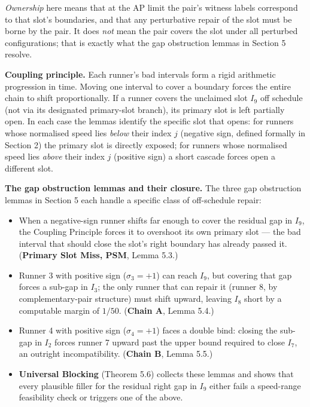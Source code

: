 \documentclass[12pt]{article}
\begin{document}
\emph{Ownership} here means that at the AP limit the pair's witness labels correspond to
that slot's boundaries, and that any perturbative repair of the slot must be borne by the
pair. It does \emph{not} mean the pair covers the slot under all perturbed configurations;
that is exactly what the gap obstruction lemmas in Section 5 resolve.

\textbf{Coupling principle.}
Each runner's bad intervals form a rigid arithmetic progression in time. Moving one
interval to cover a boundary forces the entire chain to shift proportionally. If a runner
covers the unclaimed slot $I_9$ off schedule (not via its designated primary-slot branch),
its primary slot is left partially open. In each case the lemmas identify the specific slot
that opens: for runners whose normalised speed lies \emph{below} their index $j$ (negative sign,
defined formally in Section 2) the primary slot is directly exposed; for runners whose
normalised speed lies \emph{above} their index $j$ (positive sign) a short cascade forces open
a different slot.

\textbf{The gap obstruction lemmas and their closure.}
The three gap obstruction lemmas in Section 5 each handle a specific class of off-schedule
repair:

\begin{itemize}
\item When a negative-sign runner shifts far enough to cover the residual gap in $I_9$, the
  Coupling Principle forces it to overshoot its own primary slot — the bad interval that
  should close the slot's right boundary has already passed it. (\textbf{Primary Slot Miss, PSM},
  Lemma 5.3.)
\item Runner 3 with positive sign ($\sigma_3=+1$) can reach $I_9$, but covering that gap forces a sub-gap in
  $I_3$; the only runner that can repair it (runner 8, by complementary-pair structure)
  must shift upward, leaving $I_8$ short by a computable margin of $1/50$. (\textbf{Chain A},
  Lemma 5.4.)
\item Runner 4 with positive sign ($\sigma_4=+1$) faces a double bind: closing the sub-gap in $I_2$ forces
  runner 7 upward past the upper bound required to close $I_7$, an outright
  incompatibility. (\textbf{Chain B}, Lemma 5.5.)
\item \textbf{Universal Blocking} (Theorem 5.6) collects these lemmas and shows that every
  plausible filler for the residual right gap in $I_9$ either fails a speed-range
  feasibility check or triggers one of the above.
\end{itemize}
\end{document}
